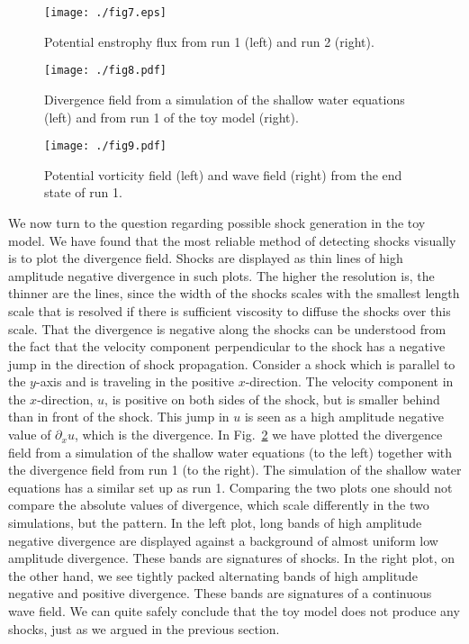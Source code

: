 \begin{figure}[h]
\centerline{\texttt{[image: ./fig7.eps]}}
 \caption{Potential enstrophy flux from run 1 (left) and run 2 (right). }
 \label{EF1}
  \end{figure}



\begin{figure}[h]
\centerline{\texttt{[image: ./fig8.pdf]}}
\caption{Divergence field from a simulation of the shallow water equations (left) and from run 1 of the toy model (right). }
\label{Shocks}
 \end{figure}

\begin{figure}[h]
\centerline{\texttt{[image: ./fig9.pdf]}}
\caption{Potential vorticity field (left) and wave field (right) from the end state of run 1.}
\label{Vis1}
\end{figure}


 We now turn to the question regarding possible shock generation in the toy model.  We have found that the most reliable method of detecting shocks visually is to plot the divergence field. Shocks are displayed as thin lines of high amplitude negative divergence in such plots. The higher the resolution is, the thinner are the lines, since the width of the shocks scales with the smallest length scale that is resolved if there is sufficient viscosity to diffuse the shocks over this scale.
That the divergence is negative along the shocks  can be understood from the fact that the velocity component perpendicular to the shock has a negative jump in the direction of shock propagation.  Consider a shock which is parallel to the $ y $-axis and is traveling in the positive $ x $-direction. The velocity component in the $ x $-direction, $ u $, is positive on both sides of the shock, but is  smaller behind than in front of the shock. This jump in $ u $ is seen as a high amplitude negative value of $ \partial_x u $, which is the divergence. In Fig.~\ref{Shocks} we have plotted the divergence field from a simulation of the shallow water equations (to the left) together with the divergence field from run 1 (to the right).
The simulation of the shallow water equations has a similar set up as run 1.
{ Comparing the two plots one should not compare the absolute values of divergence, which scale differently in the two simulations, but  the pattern. In the left plot, long bands of high amplitude negative divergence are displayed against a background of almost uniform low amplitude divergence. These bands are signatures of shocks. In the right plot, on the other hand, we see tightly packed alternating bands of high amplitude negative and positive divergence. These bands are signatures of a continuous wave field.}
We can quite safely conclude that the toy model does not produce any shocks, just as we argued in the previous section.

